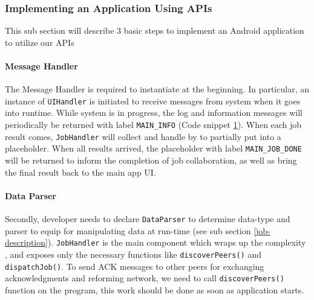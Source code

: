 \documentclass[conference]{IEEEtran}
\begin{document}
\subsubsection{Implementing an Application Using APIs}

This sub section will describe 3 basic steps to implement an Android application to utilize our APIs

\paragraph{Message Handler}

The Message Handler is required to instantiate at the beginning. In particular, an instance of \texttt{UIHandler} is initiated to receive messages from system when it goes into runtime. While system is in progress, the log and information messages will periodically be returned with label \texttt{MAIN\_INFO} (Code snippet \ref{ui_handler}). When each job result comes, \texttt{JobHandler} will collect and handle by  to partially put into a placeholder. When all results arrived, the placeholder with label \texttt{MAIN\_JOB\_DONE} will be returned to inform the completion of job collaboration, as well as bring the final result back to the main app UI.\\

\begin{figure}
\noindent {}
\label{ui_handler}
\end{figure}

\paragraph{Data Parser}

Secondly, developer needs to declare \texttt{DataParser} to determine data-type and parser to equip for manipulating data at run-time (see sub section \ref{job-description}). \texttt{JobHandler} is the main component which wraps up the complexity , and exposes only the necessary functions like \texttt{discoverPeers()} and \texttt{dispatchJob()}. To send ACK messages to other peers for exchanging acknowledgments and reforming network, we need to call \texttt{discoverPeers()} function on the program, this work should be done as soon as application starts.\\
\end{document}
